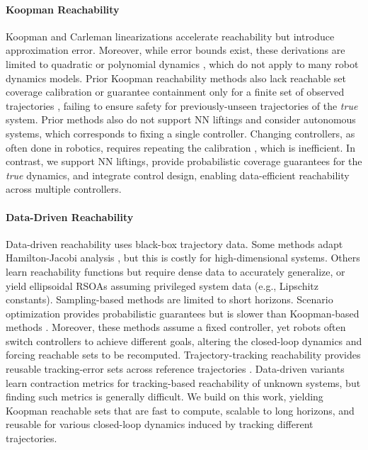 \documentclass{l4dc2026}
\begin{document}
\paragraph{Koopman Reachability}
Koopman \citep{koopman_theory} and Carleman \citep{doi:10.1137/1.9781611976847.1, Bayer2023} linearizations accelerate reachability but introduce approximation error. Moreover, while error bounds exist, these derivations are limited to quadratic or polynomial dynamics \citep{DBLP:journals/pnas/LiuKKLTC21, DBLP:journals/corr/abs-1711-02552, doi:10.1137/1.9781611976847.1}, which do not apply to many robot dynamics models. Prior Koopman reachability methods also lack reachable set coverage calibration \citep{DBLP:journals/access/ThapliyalH22} or guarantee containment only for a finite set of observed trajectories \citep{DBLP:conf/cdc/KochdumperB22}, failing to ensure safety for previously-unseen trajectories of the \textit{true} system. Prior methods also do not support NN liftings and consider autonomous systems, which corresponds to fixing a single controller. Changing controllers, as often done in robotics, requires repeating the calibration \citep{DBLP:conf/rp/ForetsS21, DBLP:conf/adhs/BakBDGP21, DBLP:journals/fmsd/BakBHKLP25}, which is inefficient. In contrast, we support NN liftings, provide probabilistic coverage guarantees for the \textit{true} dynamics, and integrate control design, enabling data-efficient reachability across multiple controllers.

\paragraph{Data-Driven Reachability}
Data-driven reachability uses black-box trajectory data. Some methods adapt Hamilton-Jacobi analysis \citep{reachblackboxdynamical}, but this is costly for high-dimensional systems. Others learn reachability functions \citep{neureach} but require dense data to accurately generalize, or yield ellipsoidal RSOAs \citep{10772635datadrivenreach} assuming privileged system data (e.g., Lipschitz constants). Sampling-based methods \citep{pmlr-v168-lew22a} are limited to short horizons. Scenario optimization provides probabilistic guarantees \citep{pmlr-v242-dietrich24a} but is slower than Koopman-based methods \citep{DBLP:journals/fmsd/BakBHKLP25}.
Moreover, these methods assume a fixed controller, yet robots often switch controllers to achieve different goals, altering the closed-loop dynamics and forcing reachable sets to be recomputed. Trajectory-tracking reachability provides reusable tracking-error sets across reference trajectories \citep{DBLP:conf/cdc/HerbertCHBFT17, DBLP:conf/wafr/SinghCHTP18, DBLP:journals/ral/KnuthCOB21}. Data-driven variants learn contraction metrics \citep{DBLP:conf/cdc/ChouOB21, DBLP:conf/wafr/ChouOB22, 10161001} for tracking-based reachability of unknown systems, but finding such metrics is generally difficult. We build on this work, yielding Koopman reachable sets that are fast to compute, scalable to long horizons, and reusable for various closed-loop dynamics induced by tracking different trajectories.
\end{document}
